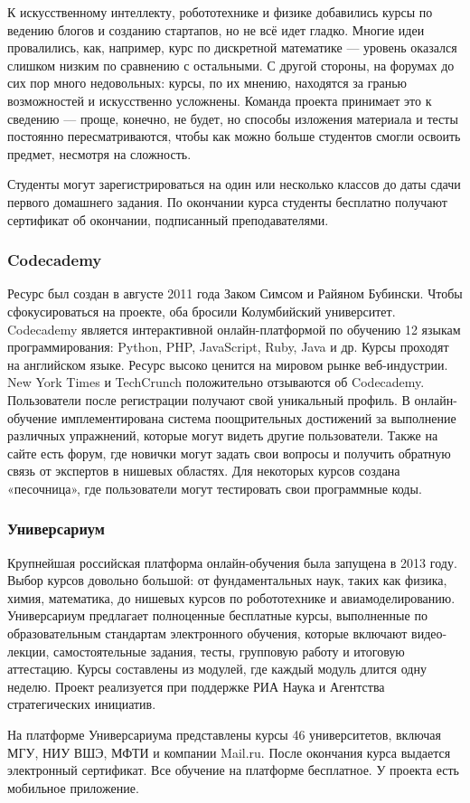К искусственному интеллекту, робототехнике и физике добавились курсы по ведению блогов и
созданию стартапов, но не всё идет гладко. Многие идеи провалились, как, например,
курс по дискретной математике — уровень оказался слишком низким по сравнению с остальными.
С другой стороны, на форумах до сих пор много недовольных: курсы, по их мнению, находятся
за гранью возможностей и искусственно усложнены. Команда проекта принимает это к
сведению — проще, конечно, не будет, но способы изложения материала и тесты постоянно
пересматриваются, чтобы как можно больше студентов смогли освоить предмет, несмотря
на сложность.

Студенты могут зарегистрироваться на один или несколько классов до даты сдачи первого
домашнего задания. По окончании курса студенты бесплатно получают сертификат об окончании,
подписанный преподавателями.

\subsubsection{Codecademy}

Ресурс был создан в августе 2011 года Заком Симсом и Райяном Бубински.
Чтобы сфокусироваться на проекте, оба бросили Колумбийский университет.
Codecademy является интерактивной онлайн-платформой по обучению 12 языкам
программирования: Python, PHP, JavaScript, Ruby, Java и др. Курсы проходят
на английском языке. Ресурс высоко ценится на мировом рынке веб-индустрии.
New York Times и TechCrunch положительно отзываются об Codecademy.
Пользователи после регистрации получают свой уникальный профиль. В онлайн-обучение
имплементирована система поощрительных достижений за выполнение различных упражнений,
которые могут видеть другие пользователи. Также на сайте есть форум, где новички
могут задать свои вопросы и получить обратную связь от экспертов в нишевых областях.
Для некоторых курсов создана «песочница», где пользователи могут тестировать свои
программные коды.

\subsubsection{Универсариум}

Крупнейшая российская платформа онлайн-обучения была запущена в 2013 году.
Выбор курсов довольно большой: от фундаментальных наук, таких как физика,
химия, математика, до нишевых курсов по робототехнике и авиамоделированию.
Универсариум предлагает полноценные бесплатные курсы, выполненные по образовательным
стандартам электронного обучения, которые включают видео-лекции, самостоятельные
задания, тесты, групповую работу и итоговую аттестацию. Курсы составлены из модулей,
где каждый модуль длится одну неделю. Проект реализуется при поддержке РИА Наука и Агентства
стратегических инициатив.

На платформе Универсариума представлены курсы 46 университетов, включая МГУ, НИУ ВШЭ, МФТИ
и компании Mail.ru. После окончания курса выдается электронный сертификат.
Все обучение на платформе бесплатное. У проекта есть мобильное приложение.